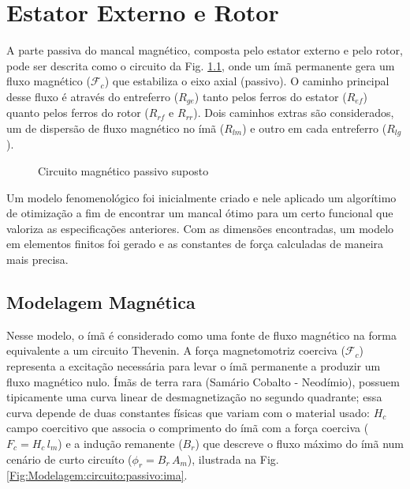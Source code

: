 \pagestyle{empty}
	\cleardoublepage
\pagestyle{fancy}


\chapter{Estator Externo e Rotor}

A parte passiva do mancal magnético, composta pelo estator externo e pelo rotor,  pode ser descrita como o circuito da Fig. \ref{Fig:Modelagem:circuito:passivo:umlado}, onde um ímã permanente gera um fluxo magnético ($\mathcal{F}_c$) que estabiliza o eixo axial (passivo). O caminho principal desse fluxo é através do entreferro ($R_{ge}$) tanto pelos ferros do estator ($R_{ef}$) quanto pelos ferros do rotor ($R_{rf}$ e $R_{rr}$). Dois caminhos extras são considerados, um de dispersão de fluxo magnético no ímã ($R_{lm}$) e outro em cada entreferro ($R_{lg}$). 

\begin{figure}[!ht]
	\centering
	\def\svgwidth{1\columnwidth}
	
	\caption{Circuito magnético passivo suposto}
	\label{Fig:Modelagem:circuito:passivo:umlado}
\end{figure}

Um modelo fenomenológico foi inicialmente criado e nele aplicado um algorítimo de otimização a fim de encontrar um mancal ótimo para um certo funcional que valoriza as especificações anteriores. Com as dimensões encontradas, um modelo em elementos finitos foi gerado e as constantes de força calculadas de maneira mais precisa.

\section{Modelagem Magnética}

Nesse modelo, o ímã é considerado como uma fonte de fluxo magnético na forma equivalente a um circuito Thevenin. A força magnetomotriz coerciva ($\mathcal{F}_c$) representa a excitação necessária para levar o ímã permanente a produzir um fluxo magnético nulo. Ímãs de terra rara (Samário Cobalto - Neodímio), possuem tipicamente uma curva linear de desmagnetização no segundo quadrante; essa curva depende de duas constantes físicas que variam com o material usado: $H_c$ campo coercitivo que associa o comprimento do ímã com a força coerciva ($ F_c = H_c \, l_m$) e a indução remanente ($B_r$) que descreve o fluxo máximo do ímã num cenário de curto circuíto ($\phi_r = B_r \, A_m$), ilustrada na Fig. \ref{Fig:Modelagem:circuito:passivo:ima}.

